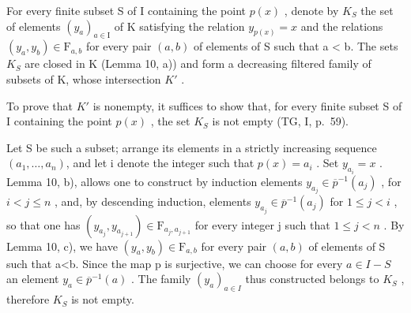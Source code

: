 For every finite subset S of I containing the point \(p(x)\) , denote by \(K_{S}\) the set of elements \((y_{a})_{a\in\mathrm{I}}\) of K satisfying the relation \(y_{p(x)} = x\) and the relations \((y_{a}, y_{b}) \in \mathrm{F}_{a,b}\) for every pair \((a, b)\) of elements of S such that a \textless{} b. The sets \(K_{S}\) are closed in K (Lemma 10, a)) and form a decreasing filtered family of subsets of K, whose intersection \(K'\) .

To prove that \(K'\) is nonempty, it suffices to show that, for every finite subset S of I containing the point \(p(x)\) , the set \(K_{S}\) is not empty (TG, I, p.~59).

Let S be such a subset; arrange its elements in a strictly increasing sequence \((a_{1},\ldots,a_{n})\), and let i denote the integer such that \(p(x)=a_{i}\) . Set \(y_{a_{i}}=x\) . Lemma 10, b), allows one to construct by induction elements \(y_{a_{j}}\in\overline{p}^{-1}(a_{j})\) , for \(i<j\leqslant n\) , and, by descending induction, elements \(y_{a_{j}}\in\overline{p}^{-1}(a_{j})\) for \(1\leqslant j<i\) , so that one has \((y_{a_{j}},y_{a_{j+1}})\in\mathrm{F}_{a_{j},a_{j+1}}\) for every integer j such that \(1\leqslant j<n\) . By Lemma 10, c), we have \((y_{a},y_{b})\in\mathrm{F}_{a,b}\) for every pair \((a,b)\) of elements of S such that a\textless b. Since the map p is surjective, we can choose for every \(a\in I-S\) an element \(y_{a}\in\overline{p}^{-1}(a)\) . The family \((y_{a})_{a\in I}\) thus constructed belongs to \(K_{S}\) , therefore \(K_{S}\) is not empty.

